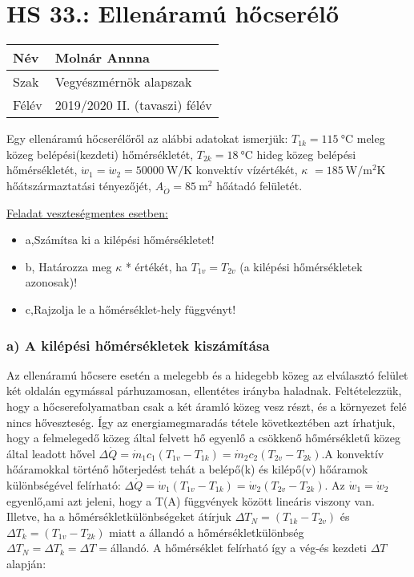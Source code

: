 		
\section*{HS 33.: Ellenáramú hőcserélő}	

\begin{tabular}{ | p{2cm} | p{14cm} | } 
	\hline
	Név & Molnár Annna \\ 
	\hline
	Szak & Vegyészmérnök alapszak \\ 
	\hline
	Félév & 2019/2020 II. (tavaszi) félév \\ 
	\hline
\end{tabular}
\vspace{0.5cm}

\noindent
 Egy ellenáramú hőcserélőről az alábbi adatokat ismerjük:
$T_{1k} = \SI{115}{\celsius}$ meleg közeg belépési(kezdeti) hőmérsékletét,
$T_{2k} = \SI{18}{\celsius}$ hideg közeg belépési hőmérsékletét,
$\dot{w}_1 = \dot{w}_2 =\SI{50000}{\watt\per\kelvin}$ konvektív vízértékét,
$\kappa$ $= \SI{185}{\watt\per\meter\squared\kelvin}$ hőátszármaztatási tényezőjét,
$A_{\ddot{O}} = \SI{85}{\meter\squared}$ hőátadó felületét.
\vspace{5mm}

\underline{Feladat veszteségmentes esetben:}
\begin{itemize}
\item a,Számítsa ki a kilépési hőmérsékletet! 
\item b, Határozza meg $\kappa$ * értékét, ha $T_{1v} = T_{2v}$ (a kilépési hőmérsékletek azonosak)!
\item c,Rajzolja le a hőmérséklet-hely függvényt!
\end{itemize}
\vspace{5mm}
\subsubsection*{a) A kilépési hőmérsékletek kiszámítása}

 Az ellenáramú hőcsere esetén a melegebb és a hidegebb közeg az elválasztó felület két oldalán egymással párhuzamosan, ellentétes irányba haladnak. Feltételezzük, hogy a hőcserefolyamatban csak a két áramló közeg vesz részt, és a környezet felé nincs hőveszteség. Így az energiamegmaradás tétele következtében azt írhatjuk, hogy a felmelegedő közeg által felvett hő egyenlő a csökkenő hőmérsékletű közeg által leadott hővel $\Delta \dot{Q} = \dot{m}_1{c}_1 \left(T_{1v} - T_{1k}\right)=\dot{m}_2{c}_2 \left(T_{2v} - T_{2k}\right)$.A konvektív hőáramokkal történő  hőterjedést tehát a belépő(k) és kilépő(v) hőáramok különbségével felírható: $\Delta \dot{Q} = \dot{w}_1 \left(T_{1v} - T_{1k}\right)=\dot{w}_2 \left(T_{2v} - T_{2k}\right)$.
 Az $\dot{w}_1 = \dot{w}_2$ egyenlő,ami azt jeleni, hogy a T(A) függvények között lineáris viszony van. Illetve, ha a hőmérsékletkülönbségeket átírjuk $\Delta T_N =\left(T_{1k} - T_{2v}\right)$ és $\Delta T_k= \left(T_{1v} - T_{2k}\right)$ miatt a állandó a hőmérsékletkülönbség $\Delta T_N = \Delta T_k = \Delta T = $állandó. A hőmérséklet felírható így a vég-és kezdeti $\Delta T$ alapján:
 
